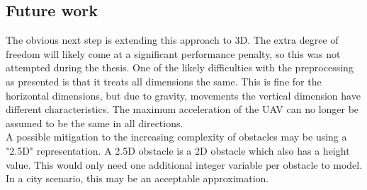 \subsection{Future work}


%
%


The obvious next step is extending this approach to 3D. The extra degree of freedom will likely come at a significant performance penalty, so this was not attempted during the thesis. One of the likely difficulties with the preprocessing as presented is that it treats all dimensions the same. This is fine for the horizontal dimensions, but due to gravity, movements the vertical dimension have different characteristics. The maximum acceleration of the UAV can no longer be assumed to be the same in all directions.\\
A possible mitigation to the increasing complexity of obstacles may be using a "2.5D" representation. A 2.5D obstacle is a 2D obstacle which also has a height value. This would only need one additional integer variable per obstacle to model. In a city scenario, this may be an acceptable approximation. \\

